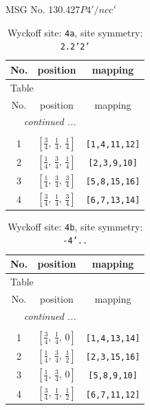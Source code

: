 \documentclass[fleqn,8pt]{jsarticle}
\begin{document}
\setcounter{MaxMatrixCols}{32}

\renewcommand{\tablename}{Table~}
\renewcommand{\figurename}{Figure~}
\begin{center}
\LARGE
MSG No. 130.427\quad$P4'/ncc'$
\end{center}
\renewcommand{\arraystretch}{1.2}
\begin{longtable}{ccc}
\caption{Wyckoff site: {\tt 4a}, site symmetry: {\tt 2.2'2'}}
 \\
 \hline \hline
No. & position & mapping \\ \hline \endfirsthead

\multicolumn{2}{l}{\tablename\ \thetable{}} \\
 \hline \hline
No. & position & mapping \\ \hline \endhead

 \hline \hline
\multicolumn{2}{r}{\footnotesize\it continued ...} \\ \endfoot

 \hline \hline
\multicolumn{2}{r}{} \\ \endlastfoot

1 & $\left[ \frac{3}{4},\, \frac{1}{4},\, \frac{1}{4} \right]$ & {\tt [1,4,11,12]} \\ \hline
2 & $\left[ \frac{1}{4},\, \frac{3}{4},\, \frac{1}{4} \right]$ & {\tt [2,3,9,10]} \\ \hline
3 & $\left[ \frac{1}{4},\, \frac{3}{4},\, \frac{3}{4} \right]$ & {\tt [5,8,15,16]} \\ \hline
4 & $\left[ \frac{3}{4},\, \frac{1}{4},\, \frac{3}{4} \right]$ & {\tt [6,7,13,14]} \\
\end{longtable}
\renewcommand{\arraystretch}{1.2}
\begin{longtable}{ccc}
\caption{Wyckoff site: {\tt 4b}, site symmetry: {\tt -4'..}}
 \\
 \hline \hline
No. & position & mapping \\ \hline \endfirsthead

\multicolumn{2}{l}{\tablename\ \thetable{}} \\
 \hline \hline
No. & position & mapping \\ \hline \endhead

 \hline \hline
\multicolumn{2}{r}{\footnotesize\it continued ...} \\ \endfoot

 \hline \hline
\multicolumn{2}{r}{} \\ \endlastfoot

1 & $\left[ \frac{3}{4},\, \frac{1}{4},\, 0 \right]$ & {\tt [1,4,13,14]} \\ \hline
2 & $\left[ \frac{1}{4},\, \frac{3}{4},\, \frac{1}{2} \right]$ & {\tt [2,3,15,16]} \\ \hline
3 & $\left[ \frac{1}{4},\, \frac{3}{4},\, 0 \right]$ & {\tt [5,8,9,10]} \\ \hline
4 & $\left[ \frac{3}{4},\, \frac{1}{4},\, \frac{1}{2} \right]$ & {\tt [6,7,11,12]} \\
\end{longtable}
\end{document}
